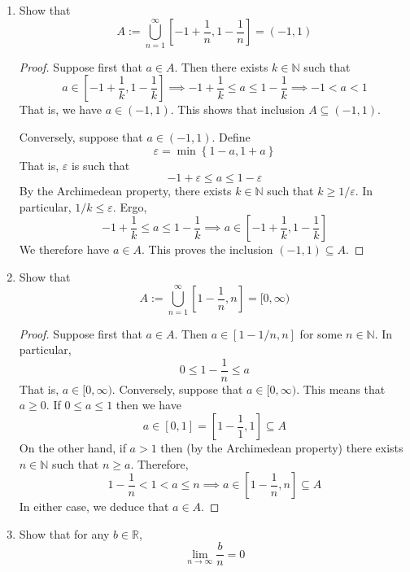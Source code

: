 \documentclass[12pt, reqno]{article}
\numberwithin{equation}{section}
\theoremstyle{definition}
\theoremstyle{remark}
\newcommand{\NN}{\mathbb{N}}
\newcommand{\RR}{\mathbb{R}}
\newcommand{\set}[1]{\left\{#1\right\}}
\renewcommand{\epsilon}{\varepsilon}
\begin{document}
\begin{enumerate}[leftmargin=*]
\begin{proof}
		      So, if $a\in A$ then we see that $a\geq 0$ and $a\leq 0$. That is, $a=0$. This shows that $A\subseteq \set{0}$.
	      \end{proof}

	\item Show that
	      \[
		      A:=\bigcup_{n=1}^\infty\left[-1+\frac{1}{n}, 1-\frac{1}{n}\right] = (-1,1)
	      \]
	      \begin{proof}
		      Suppose first that $a\in A$. Then there exists $k\in \NN$ such that
		      \[
			      a\in \left[-1+\frac{1}{k}, 1-\frac{1}{k}\right]
			      \implies
			      -1+\frac{1}{k} \leq a \leq 1-\frac{1}{k}
			      \implies -1 < a < 1
		      \]
		      That is, we have $a\in (-1,1)$. This shows that inclusion $A\subseteq (-1,1)$.

		      Conversely, suppose that $a\in (-1,1)$. Define
		      \[
			      \epsilon = \min\set{1-a, 1+a}
		      \]
		      That is, $\epsilon$ is such that
		      \[
			      -1 + \epsilon \leq a \leq 1-\epsilon
		      \]
		      By the Archimedean property, there exists $k\in\NN$ such that $k \geq 1/\epsilon$. In particular, $1/k \leq \epsilon$. Ergo,
		      \[
			      -1 + \frac{1}{k} \leq a \leq 1-\frac{1}{k} \implies a\in \left[-1+\frac{1}{k}, 1-\frac{1}{k}\right]
		      \]
		      We therefore have $a\in A$. This proves the inclusion $(-1,1)\subseteq A$.
	      \end{proof}

	\item Show that
	      \[
		      A:= \bigcup_{n=1}^\infty\left[1-\frac{1}{n}, n\right] = [0, \infty)
	      \]

	      \begin{proof}
		      Suppose first that $a\in A$. Then $a\in [1-1/n, n]$ for some $n\in \NN$. In particular,
		      \[
			      0 \leq 1-\frac{1}{n} \leq a
		      \]
		      That is, $a\in [0, \infty)$. Conversely, suppose that $a\in [0, \infty)$. This means that $a\geq 0$. If $0 \leq a \leq 1$ then we have
		      \[
			      a \in [0, 1] = \left[1-\frac{1}{1}, 1\right] \subseteq A
		      \]
		      On the other hand, if $a > 1$ then (by the Archimedean property) there exists $n \in \NN$ such that $n \geq a$. Therefore,
		      \[
			      1 - \frac{1}{n} < 1 < a \leq n \implies a \in \left[1-\frac{1}{n}, n\right] \subseteq A
		      \]
		      In either case, we deduce that $a\in A$.
	      \end{proof}
	\item Show that for any $b\in \RR$,
	      \[
		      \lim_{n\to\infty}\frac{b}{n} = 0
	      \]


\end{enumerate}
\end{document}
